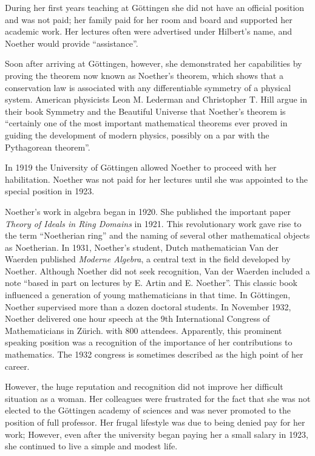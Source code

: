 \documentclass[b5paper]{article}
\begin{document}
During her first years teaching at Göttingen she did not have an official position and was not paid; her family paid for her room and board and supported her academic work. Her lectures often were advertised under Hilbert's name, and Noether would provide ``assistance''.

Soon after arriving at Göttingen, however, she demonstrated her capabilities by proving the theorem now known as Noether's theorem, which shows that a conservation law is associated with any differentiable symmetry of a physical system. American physicists Leon M. Lederman and Christopher T. Hill argue in their book Symmetry and the Beautiful Universe that Noether's theorem is ``certainly one of the most important mathematical theorems ever proved in guiding the development of modern physics, possibly on a par with the Pythagorean theorem''.

In 1919 the University of Göttingen allowed Noether to proceed with her habilitation. Noether was not paid for her lectures until she was appointed to the special position in 1923.

Noether's work in algebra began in 1920. She published the important paper {\em Theory of Ideals in Ring Domains} in 1921. This revolutionary work gave rise to the term ``Noetherian ring'' and the naming of several other mathematical objects as Noetherian. In 1931, Noether's student, Dutch mathematician Van der Waerden published {\em Moderne Algebra}, a central text in the field developed by Noether. Although Noether did not seek recognition, Van der Waerden included a note ``based in part on lectures by E. Artin and E. Noether''. This classic book influenced a generation of young mathematicians in that time. In Göttingen, Noether supervised more than a dozen doctoral students. In November 1932, Noether delivered one hour speech at the 9th International Congress of Mathematicians in Zürich. with 800 attendees. Apparently, this prominent speaking position was a recognition of the importance of her contributions to mathematics. The 1932 congress is sometimes described as the high point of her career.

However, the huge reputation and recognition did not improve her difficult situation as a woman. Her colleagues were frustrated for the fact that she was not elected to the Göttingen academy of sciences and was never promoted to the position of full professor. Her frugal lifestyle was due to being denied pay for her work; However, even after the university began paying her a small salary in 1923, she continued to live a simple and modest life.
\end{document}
